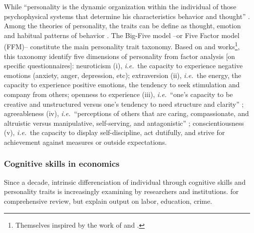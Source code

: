 \documentclass[a4paper, 11pt, onecolumn]{article}
\newcommand{\ie}{\textit{i.e.}}
\begin{document}
While ``personality is the dynamic organization within the individual of those psychophysical systems that determine his characteristics behavior and thought'' \citep{Allport1961}.
Among the theories of personality, the traits can be define as thought, emotion and habitual patterns of behavior \citep{Kassin2003}.
The Big-Five model --or Five Factor model (FFM)-- constitute the main personality trait taxonomy.
Based on \cite{Goldberg1981} and \cite{McCrae1987} works\footnote{Themselves inspired by the work of \cite{Cattell1943, Cattell1947} and \cite{Norman1963}.}, this taxonomy identify five dimensions of personality from factor analysis [on specific questionnaires]: neuroticism (i), \ie~the capacity to experience negative emotions (anxiety, anger, depression, etc); extraversion (ii), \ie~the energy, the capacity to experience positive emotions, the tendency to seek stimulation and company from others; openness to experience (iii), \ie~``one’s capacity to be creative and unstructured versus one’s tendency to need structure and clarity'' \citep{Piedmont2014}; agreeableness (iv), \ie~``perceptions of others that are caring, compassionate, and altruistic versus manipulative, self-serving, and antagonistic'' \citep{Piedmont2014}; conscientiousness (v), \ie~the capacity to display self-discipline, act dutifully, and strive for achievement against measures or outside expectations.	
	
	
	
		\subsubsection{Cognitive skills in economics}
	
Since a decade, intrinsic differenciation of individual through cognitive skills and personality traits is increasingly examining by researchers and institutions. 
\cite{Almlund2011} for comprehensive review, but explain output on labor, education, crime.
\end{document}
